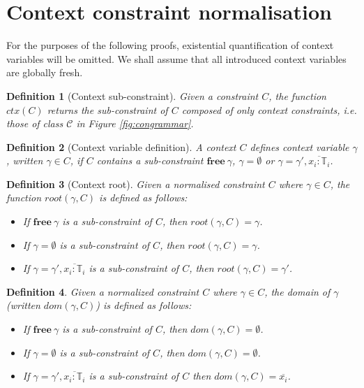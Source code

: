 \documentclass[preprint]{sigplanconf}
\newtheorem{defn}{Definition}
\newcommand{\figref}[1]{Figure \ref{#1}}
\newcommand{\free}[1]{\mathbf{free}\:#1}
\newcommand{\tinf}{\mathbb{T}}
\begin{document}

\section{Context constraint normalisation}
\label{app:ctx_norm}

For the purposes of the following proofs, existential quantification of
context variables will be omitted. We shall assume that all introduced
context variables are globally fresh.

\begin{defn}[Context sub-constraint]
Given a constraint $C$, the function $ctx(C)$ returns the sub-constraint
of $C$ composed of only context constraints, i.e. those of class $\mathcal{C}$
in \figref{fig:congrammar}.
\end{defn}

\begin{defn}[Context variable definition]
A context $C$ {\it defines} context variable $\gamma$, written
$\gamma \in C$, if $C$ contains a sub-constraint $\free{\gamma}$,
$\gamma = \emptyset$ or $\gamma = \gamma', \overline{x_i : \tinf_i}$.
\end{defn}

\begin{defn}[Context root]
Given a normalised constraint $C$ where $\gamma \in C$, the 
function $root(\gamma, C)$ is defined as follows:

\begin{itemize}
\item If $\free{\gamma}$ is a sub-constraint of $C$, then $root(\gamma, C) = \gamma$.
\item If $\gamma = \emptyset$ is a sub-constraint of $C$, then $root(\gamma, C) = \gamma$.
\item If $\gamma = \gamma', \overline{x_i : \tinf_i}$ is a sub-constraint of $C$, then
$root(\gamma, C) = \gamma'$.
\end{itemize}
\end{defn}

\begin{defn}
Given a normalized constraint $C$ where $\gamma \in C$,
the {\it domain} of $\gamma$ (written $dom(\gamma, C)$) is defined as follows:

\begin{itemize}
\item If $\free{\gamma}$ is a sub-constraint of $C$, 
then $dom(\gamma, C) = \emptyset$.
\item If $\gamma = \emptyset$ is a sub-constraint of $C$,
then $dom(\gamma, C) = \emptyset$.
\item If $\gamma = \gamma', \overline{x_i : \tinf_i}$ is a sub-constraint of $C$
then $dom(\gamma, C) = \overline{x_i}$.
\end{itemize}
\end{defn}
\end{document}
